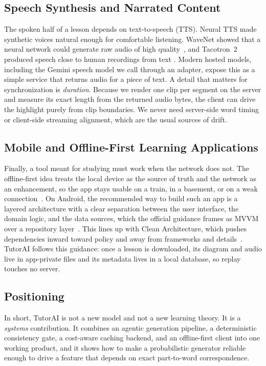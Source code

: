 \documentclass[conference]{IEEEtran}
\begin{document}
\subsection{Speech Synthesis and Narrated Content}
The spoken half of a lesson depends on text-to-speech (TTS). Neural TTS made
synthetic voices natural enough for comfortable listening. WaveNet showed that
a neural network could generate raw audio of high quality~\cite{oord2016wavenet},
and Tacotron~2 produced speech close to human recordings from text
\cite{shen2018tacotron2}. Modern hosted models, including the Gemini speech
model we call through an adapter, expose this as a simple service that returns
audio for a piece of text. A detail that matters for synchronization is
\emph{duration}. Because we render one clip per segment on the server and
measure its exact length from the returned audio bytes, the client can drive the
highlight purely from clip boundaries. We never need server-side word timing or
client-side streaming alignment, which are the usual sources of drift.

\subsection{Mobile and Offline-First Learning Applications}
Finally, a tool meant for studying must work when the network does not. The
offline-first idea treats the local device as the source of truth and the
network as an enhancement, so the app stays usable on a train, in a basement,
or on a weak connection~\cite{offlinefirst}. On Android, the recommended way to
build such an app is a layered architecture with a clear separation between
the user interface, the domain logic, and the data sources, which the official
guidance frames as MVVM over a repository layer~\cite{androidguide}. This lines
up with Clean Architecture, which pushes dependencies inward toward
policy and away from frameworks and details~\cite{martin2017clean}. TutorAI
follows this guidance: once a lesson is downloaded, its diagram and audio live
in app-private files and its metadata lives in a local database, so replay
touches no server.

\subsection{Positioning}
In short, TutorAI is not a new model and not a new learning theory. It is a
\emph{systems} contribution. It combines an agentic generation pipeline, a
deterministic consistency gate, a cost-aware caching backend, and an
offline-first client into one working product, and it shows how to make a
probabilistic generator reliable enough to drive a feature that depends on
exact part-to-word correspondence.
\end{document}
